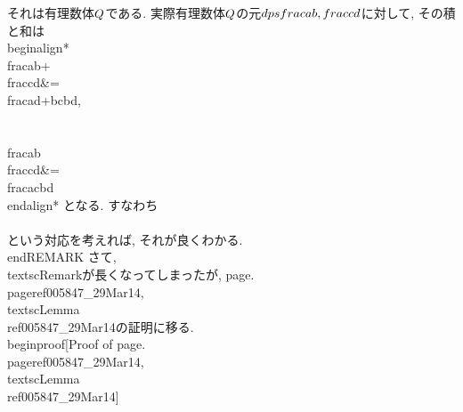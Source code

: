  それは有理数体$\\Q$である. 実際有理数体$\\Q$の元$\\dps
 \\frac{a}{b},\\frac{c}{d}$に対して, その積と和は
 \\begin{align*}
  \\frac{a}{b}+\\frac{c}{d}&=\\frac{ad+bc}{bd},\\\\
  \\frac{a}{b}\\frac{c}{d}&=\\frac{ac}{bd}
 \\end{align*}
 となる. すなわち
 \\[
  \\xymatrix{
 [a,b]\\ar@{<->}[r]&\\dps\\frac{a}{b},&[c,d]\\ar@{<->}[r]&\\dps\\frac{c}{d}
 }
 \\]
 \\[
 \\xymatrix{
 [a,b]+[c,d]=[ad+bc,bd]\\ar@{<->}[r]&\\dps\\frac{a}{b}+\\frac{c}{d}=\\frac{ad+bc}{bd},&[a,b][c,d]=[ac,bd]\\ar@{<->}[r]&\\dps\\frac{a}{b}\\frac{c}{d}=\\frac{ac}{bd}
 }
 \\]
 という対応を考えれば, それが良くわかる.
\\end{REMARK}
さて, \\textsc{Remark}が長くなってしまったが,
page.\\pageref{005847_29Mar14}, \\textsc{Lemma}~\\ref{005847_29Mar14}の証明に移る.
  \\begin{proof}[Proof of page.\\pageref{005847_29Mar14}, \\textsc{Lemma}~\\ref{005847_29Mar14}]
